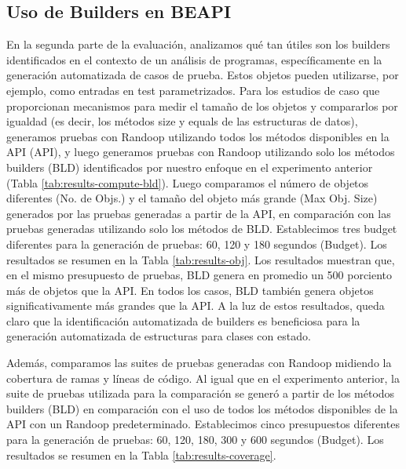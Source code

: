 \subsection{Uso de Builders en BEAPI}
En la segunda parte de la evaluación, analizamos qué tan útiles son los builders identificados en el contexto de un análisis de programas, específicamente en la generación automatizada de casos de prueba. Estos objetos pueden utilizarse, por ejemplo, como entradas en test parametrizados. Para los estudios de caso que proporcionan mecanismos para medir el tamaño de los objetos y compararlos por igualdad (es decir, los métodos size y equals de las estructuras de datos), generamos pruebas con Randoop utilizando todos los métodos disponibles en la API (API), y luego generamos pruebas con Randoop utilizando solo los métodos builders (BLD) identificados por nuestro enfoque en el experimento anterior (Tabla \ref{tab:results-compute-bld}). Luego comparamos el número de objetos diferentes (No. de Objs.) y el tamaño del objeto más grande (Max Obj. Size) generados por las pruebas generadas a partir de la API, en comparación con las pruebas generadas utilizando solo los métodos de BLD. Establecimos tres budget diferentes para la generación de pruebas: 60, 120 y 180 segundos (Budget). Los resultados se resumen en la Tabla \ref{tab:results-obj}. Los resultados muestran que, en el mismo presupuesto de pruebas, BLD genera en promedio un 500 porciento más de objetos que la API. En todos los casos, BLD también genera objetos significativamente más grandes que la API. A la luz de estos resultados, queda claro que la identificación automatizada de builders es beneficiosa para la generación automatizada de estructuras para clases con estado.

Además, comparamos las suites de pruebas generadas con Randoop midiendo la cobertura de ramas y líneas de código. Al igual que en el experimento anterior, la suite de pruebas utilizada para la comparación se generó a partir de los métodos builders (BLD) en comparación con el uso de todos los métodos disponibles de la API con un Randoop predeterminado. Establecimos cinco presupuestos diferentes para la generación de pruebas: 60, 120, 180, 300 y 600 segundos (Budget). Los resultados se resumen en la Tabla \ref{tab:results-coverage}.

